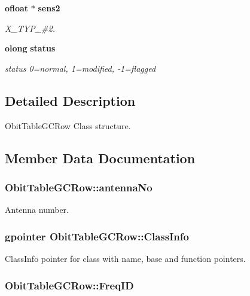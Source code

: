 \begin{CompactItemize}
{\bf ofloat} $\ast$ {\bf sens2}
\begin{CompactList}\small\item\em X\_\-TYP\_\-\#2. \item\end{CompactList}\item 
{\bf olong} {\bf status}
\begin{CompactList}\small\item\em status 0=normal, 1=modified, -1=flagged \item\end{CompactList}\end{CompactItemize}


\subsection{Detailed Description}
Obit\-Table\-GCRow Class structure. 



\subsection{Member Data Documentation}
\subsubsection{ {\bf Obit\-Table\-GCRow::antenna\-No}}\label{structObitTableGCRow_o6}


Antenna number. 

\subsubsection{\setlength{\rightskip}{0pt plus 5cm}gpointer {\bf Obit\-Table\-GCRow::Class\-Info}}\label{structObitTableGCRow_o1}


Class\-Info pointer for class with name, base and function pointers. 

\subsubsection{ {\bf Obit\-Table\-GCRow::Freq\-ID}}\label{structObitTableGCRow_o8}


